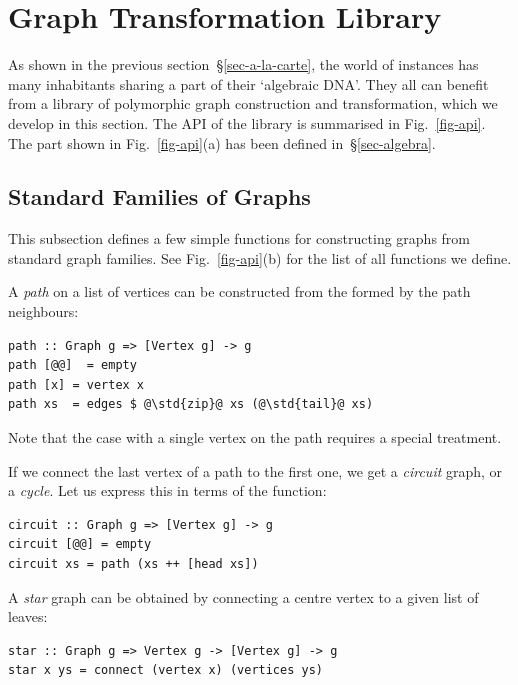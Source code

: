 \section{Graph Transformation Library}\label{sec-transformations}

As shown in the previous section~\S\ref{sec-a-la-carte}, the world of 
instances has many inhabitants sharing a part of their `algebraic DNA'. They all
can benefit from a library of polymorphic graph construction and transformation,
which we develop in this section. The API of the library is summarised in
Fig.~\ref{fig-api}. The part shown in Fig.~\ref{fig-api}(a) has been defined
in~\S\ref{sec-algebra}.

\subsection{Standard Families of Graphs}\label{sub-families}

This subsection defines a few simple functions for constructing graphs from
standard graph families. See Fig.~\ref{fig-api}(b) for the list of all functions
we define.

A \emph{path} on a list of vertices can be constructed from the 
formed by the path neighbours:

\begin{verbatim}
path :: Graph g => [Vertex g] -> g
path [@@]  = empty
path [x] = vertex x
path xs  = edges $ @\std{zip}@ xs (@\std{tail}@ xs)
\end{verbatim}

\noindent
Note that the case with a single vertex on the path requires a special treatment.

If we connect the last vertex of a path to the first one, we get a \emph{circuit}
graph, or a \emph{cycle}. Let us express this in terms of the  function:

\begin{verbatim}
circuit :: Graph g => [Vertex g] -> g
circuit [@@] = empty
circuit xs = path (xs ++ [head xs])
\end{verbatim}

A \emph{star} graph can be obtained by connecting a centre vertex to a given
list of leaves:

\begin{verbatim}
star :: Graph g => Vertex g -> [Vertex g] -> g
star x ys = connect (vertex x) (vertices ys)
\end{verbatim}

